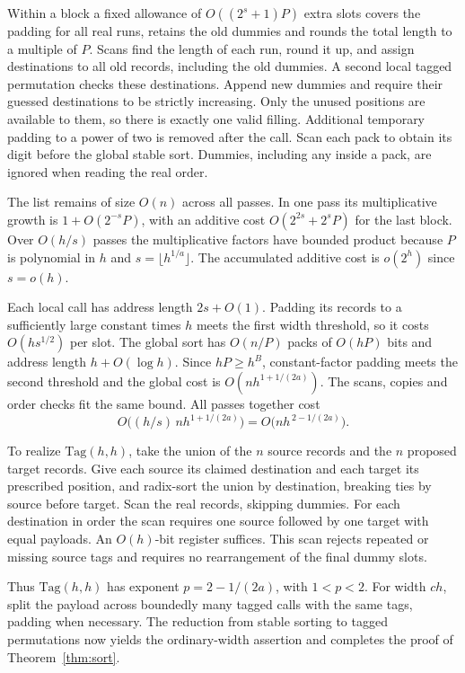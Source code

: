 Within a block a fixed allowance of $O((2^s+1)P)$ extra slots covers
the padding for all real runs, retains the old dummies and rounds the
total length to a multiple of $P$. Scans find the length of each run,
round it up, and assign destinations to all old records, including the
old dummies. A second local tagged permutation checks these destinations.
Append new dummies and require their guessed destinations to be strictly
increasing. Only the unused positions are available to them, so there
is exactly one valid filling. Additional temporary padding to a power of
two is removed after the call. Scan each pack to obtain its digit before
the global stable sort. Dummies, including any inside a pack, are ignored
when reading the real order.

The list remains of size $O(n)$ across all passes. In one pass its
multiplicative growth is $1+O(2^{-s}P)$, with an additive cost
$O(2^{2s}+2^sP)$ for the last block. Over $O(h/s)$ passes the
multiplicative factors have bounded product because $P$ is polynomial
in $h$ and $s=\lfloor h^{1/a}\rfloor$. The accumulated additive cost
is $o(2^h)$ since $s=o(h)$.

Each local call has address length $2s+O(1)$. Padding its records to
a sufficiently large constant times $h$ meets the first width threshold,
so it costs $O(hs^{1/2})$ per slot. The global sort has $O(n/P)$ packs
of $O(hP)$ bits and address length $h+O(\log h)$. Since $hP\ge h^B$,
constant-factor padding meets the second threshold and the global
cost is $O(nh^{1+1/(2a)})$. The scans, copies and order checks
fit the same bound. All passes together cost
\[
            O\bigl((h/s)\,nh^{1+1/(2a)}\bigr)
               =O\bigl(nh^{\,2-1/(2a)}\bigr).
\]

To realize $\mathrm{Tag}(h,h)$, take the union of the $n$ source records
and the $n$ proposed target records. Give each source its claimed
destination and each target its prescribed position, and radix-sort the
union by destination, breaking ties by source before target. Scan the
real records, skipping dummies. For each destination in order the scan
requires one source followed by one target with equal payloads.
An $O(h)$-bit register suffices. This scan rejects repeated or missing
source tags and requires no rearrangement of the final dummy slots.

Thus $\mathrm{Tag}(h,h)$ has exponent $p=2-1/(2a)$, with $1<p<2$.
For width $ch$, split the payload across boundedly many tagged calls
with the same tags, padding when necessary. The reduction from stable
sorting to tagged permutations now yields the ordinary-width assertion
and completes the proof of Theorem~\ref{thm:sort}.

